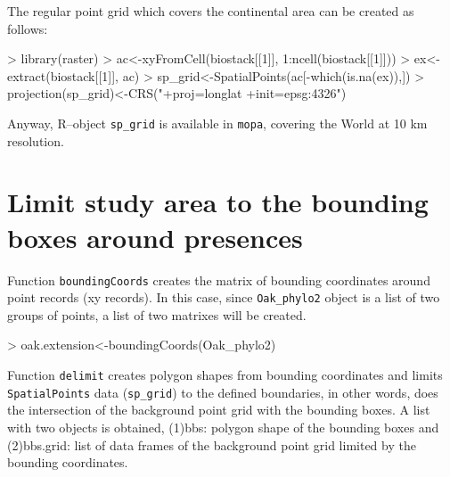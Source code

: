 \documentclass[10pt,a4paper]{report}
\begin{document}
The regular point grid which covers the continental area can be created as follows:

\begin{Schunk}
\begin{Sinput}
> library(raster)
> ac<-xyFromCell(biostack[[1]],  1:ncell(biostack[[1]]))
> ex<-extract(biostack[[1]], ac)
> sp_grid<-SpatialPoints(ac[-which(is.na(ex)),])
> projection(sp_grid)<-CRS("+proj=longlat +init=epsg:4326")
\end{Sinput}
\end{Schunk}

Anyway, R--object \texttt{sp\_grid} is available in \texttt{mopa}, covering the World at 10 km resolution.

\section{Limit study area to the bounding boxes around presences}

Function \texttt{boundingCoords} creates the matrix of bounding coordinates around point records (xy records). In this case, since \texttt{Oak\_phylo2} object is a list of two groups of points, a list of two matrixes will be created.

\begin{Schunk}
\begin{Sinput}
>  oak.extension<-boundingCoords(Oak_phylo2)
\end{Sinput}
\end{Schunk}

Function \texttt{delimit} creates polygon shapes from bounding coordinates and limits \texttt{SpatialPoints} data (\texttt{sp\_grid}) to the defined boundaries, in other words, does the intersection of the background point grid with the bounding boxes. A list with two objects is obtained, (1)bbs: polygon shape of the bounding boxes and (2)bbs.grid: list of data frames of the background point grid limited by the bounding coordinates.
\end{document}
